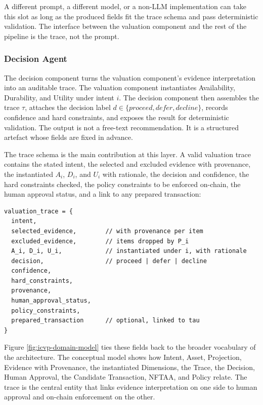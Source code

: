A different prompt, a different model, or a non-LLM implementation can take this slot as long as the produced fields fit the trace schema and pass deterministic validation. The interface between the valuation component and the rest of the pipeline is the trace, not the prompt.

\subsubsection{Decision Agent}

The decision component turns the valuation component's evidence interpretation into an auditable trace. The valuation component instantiates Availability, Durability, and Utility under intent $i$. The decision component then assembles the trace $\tau$, attaches the decision label $d \in \{\textit{proceed}, \textit{defer}, \textit{decline}\}$, records confidence and hard constraints, and exposes the result for deterministic validation. The output is not a free-text recommendation. It is a structured artefact whose fields are fixed in advance.

The trace schema is the main contribution at this layer. A valid valuation trace contains the stated intent, the selected and excluded evidence with provenance, the instantiated $A_i$, $D_i$, and $U_i$ with rationale, the decision and confidence, the hard constraints checked, the policy constraints to be enforced on-chain, the human approval status, and a link to any prepared transaction:

\begin{lstlisting}[caption={Required fields of the valuation trace $\tau$.}, label={lst:tracefields}]
valuation_trace = {
  intent,
  selected_evidence,        // with provenance per item
  excluded_evidence,        // items dropped by P_i
  A_i, D_i, U_i,            // instantiated under i, with rationale
  decision,                 // proceed | defer | decline
  confidence,
  hard_constraints,
  provenance,
  human_approval_status,
  policy_constraints,
  prepared_transaction      // optional, linked to tau
}
\end{lstlisting}

Figure \ref{fig:icvp-domain-model} ties these fields back to the broader vocabulary of the architecture. The conceptual model shows how Intent, Asset, Projection, Evidence with Provenance, the instantiated Dimensions, the Trace, the Decision, Human Approval, the Candidate Transaction, NFTAA, and Policy relate. The trace is the central entity that links evidence interpretation on one side to human approval and on-chain enforcement on the other.

